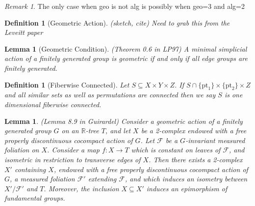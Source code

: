 \documentclass{article}
\theoremstyle{mystyle}
\newtheorem{lem}[thm]{Lemma}
\newtheorem{defn}[thm]{Definition}
\theoremstyle{remark}
\newtheorem{rmk}{Remark}[section]
\begin{document}
\begin{rmk}
    The only case when geo is not alg is possibly when geo=3 and alg=2
\end{rmk}
 \begin{defn}
     [Geometric Action]
     \label{defn:geometricaction}
     (sketch, cite)
     Need to grab this from the Leveitt paper
 \end{defn}
\begin{lem}
    [Geometric Condition]
    \label{lem:simpgeo} 
    (Theorem 0.6 in LP97)
    A minimal simplicial action of a finitely generated group is geometric if and only if all edge groups are finitely generated.
\end{lem}
\begin{defn}
    [Fiberwise Connected]
    \label{def:connfibers} 
    Let \(S \subseteq X \times Y \times Z\). If \(S \cap \{\text{pt}_1\} \times \{\text{pt}_2\} \times Z\) and all similar sets as well as permutations are connected then we say \(S\) is one dimensional fiberwise connected.
\end{defn}
\begin{lem}
    \label{lem:guirardel-extension}
    (Lemma 8.9 in Guirardel)
    Consider a geometric action of a finitely generated group \(G\) on an \(\mathbb{R}\)-tree \(T\), and let \(X\) be a 2-complex endowed with a free properly discontinuous cocompact action of \(G\). Let \(\mathscr{F}\) be a \(G\)-invariant measured foliation on \(X\). Consider a map \(f: X \to T\) which is constant on leaves of \(\mathscr{F}\), and isometric in restriction to transverse edges of \(X\). Then there exists a 2-complex \( X'\) containing \(X\), endowed with a free properly discontinuous cocompact action of \(G\), a measured foliation \(\mathscr{F} '\) extending \(\mathscr{F}\), and which induces an isometry between \(X'/ \mathscr{F}'\) and \(T\). Moreover, the inclusion \(X \subseteq X'\) induces an epimorphism of fundamental groups.
\end{lem}
\end{document}
